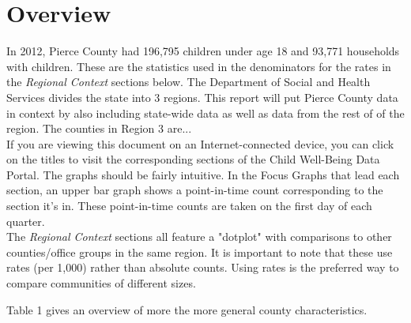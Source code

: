 \documentclass{article}\usepackage{graphicx, color}
\begin{document}

\section*{Overview}

In 2012, Pierce County had {196,795} children under age 18 and {93,771} households with children. These are the statistics used in the denominators for the rates in the \emph{Regional Context} sections below. The Department of Social and Health Services divides the state into 3 regions. This report will put Pierce County data in context by also including state-wide data as well as data from the rest of of the region. The counties in Region 3 are...\\

If you are viewing this document on an Internet-connected device, you can click on the titles to visit the corresponding sections of the Child Well-Being Data Portal. The graphs should be fairly intuitive. In the Focus Graphs that lead each section, an upper bar graph shows a point-in-time count corresponding to the section it's in. These point-in-time counts are taken on the first day of each quarter.\\

The \emph{Regional Context} sections all feature a "dotplot" with comparisons to other counties/office groups in the same region. It is important to note that these use rates (per 1,000) rather than absolute counts. Using rates is the preferred way to compare communities of different sizes.

Table 1 gives an overview of more the more general county characteristics.
\end{document}
